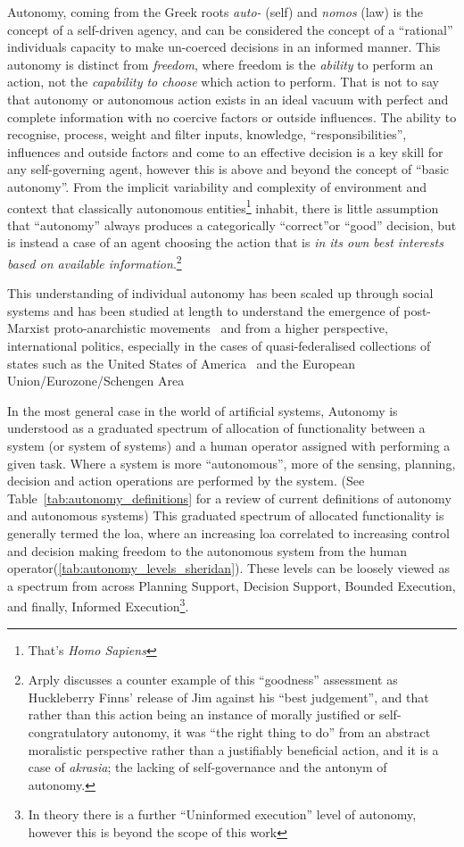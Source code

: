 Autonomy, coming from the Greek roots \textit{auto-} (self) and \textit{nomos} (law) is the concept of a self-driven agency, and can be considered the concept of a ``rational'' individuals capacity to make un-coerced decisions in an informed manner. 
This autonomy is distinct from \textit{freedom}, where freedom is the \textit{ability} to perform an action, not the \textit{capability to choose} which action to perform.
That is not to say that autonomy or autonomous action exists in an ideal vacuum with perfect and complete information with no coercive factors or outside influences.
The ability to recognise, process, weight and filter inputs, knowledge, ``responsibilities'', influences and outside factors and come to an effective decision is a key skill for any self-governing agent, however this is above and beyond the concept of ``basic autonomy''.
From the implicit variability and complexity of environment and context that classically autonomous entities\footnote{That's \textit{Homo Sapiens}} inhabit, there is little assumption that ``autonomy'' always produces a categorically ``correct''or ``good'' decision, but is instead a case of an agent choosing the action that is \textit{in its own best interests based on available information}\cite{Arpaly2003}.\footnote{Arply discusses a counter example of this ``goodness'' assessment as  Huckleberry Finns' release of Jim against his ``best judgement'', and that rather than this action being an instance of morally justified or self-congratulatory autonomy, it was ``the right thing to do'' from an abstract moralistic perspective rather than a justifiably beneficial action, and it is a case of \textit{akrasia}; the lacking of self-governance and the antonym of autonomy.}

This understanding of individual autonomy has been scaled up through social systems and has been studied at length to understand the emergence of post-Marxist proto-anarchistic movements~\cite{Hunter2016} and from a higher perspective, international politics, especially in the cases of quasi-federalised collections of states such as the United States of America~\cite{Halberstam2001} and the European Union/Eurozone/Schengen Area~\cite{Richter2012}


In the most general case in the world of artificial systems, Autonomy is understood as a graduated spectrum of allocation of functionality between a system (or system of systems) and a human operator assigned with performing a given task. 
Where a system is more ``autonomous'', more of the sensing, planning, decision and action operations are performed by the system. (See Table~\ref{tab:autonomy_definitions} for a review of current definitions of autonomy and autonomous systems)
This graduated spectrum of allocated functionality is generally termed the \acrfull{loa}, where an increasing \gls{loa} correlated to increasing control and decision making freedom to the autonomous system from the human operator(\autoref{tab:autonomy_levels_sheridan}).
These levels can be loosely viewed as a spectrum from across Planning Support, Decision Support, Bounded Execution, and finally, Informed Execution\footnote{In theory there is a further ``Uninformed execution'' level of autonomy, however this is beyond the scope of this work\cite{Cameron1984}}.

